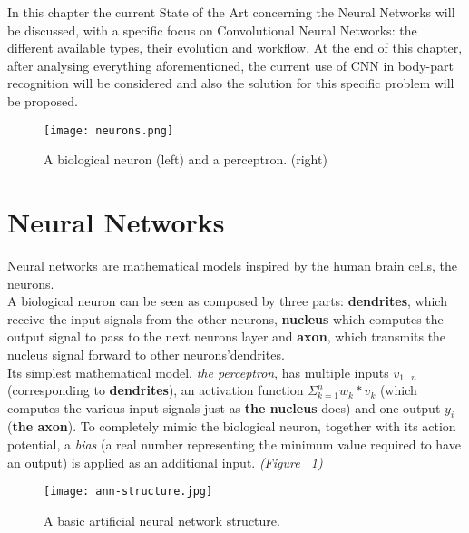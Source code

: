 \documentclass[../main.tex]{subfiles}
\begin{document}
\label{stateofart}
\thispagestyle{empty}

In this chapter the current State of the Art concerning the Neural Networks will be discussed, with a specific focus on Convolutional Neural Networks: the different available types, their evolution and workflow. At the end of this chapter, after analysing everything aforementioned, the current use of CNN in body-part recognition will be considered and also the solution for this specific problem will be proposed. \\ 

\vspace{5mm}
\clearpage
\newpage

\begin{figure}[H]
  \centering
  \texttt{[image: neurons.png]}
  \caption{A biological neuron (left) and a perceptron. (right) \cite{Bio}}
  \label{fig:neuron}
\end{figure}


\section{Neural Networks}
Neural networks are mathematical models inspired by the human brain cells, the neurons. \\ 
A biological neuron can be seen as composed by three parts: \textbf{dendrites}, which receive the input signals from the other neurons, \textbf{nucleus} which computes the output signal to pass to the next neurons layer and \textbf{axon}, which transmits the nucleus signal forward to other neurons'dendrites. \\
Its simplest mathematical model, \textit{the perceptron}, has multiple inputs $v_{1...n}$ (corresponding to \textbf{dendrites}), an activation function $\Sigma_{k=1}^n w_k*v_k$ (which computes the various input signals just as \textbf{the nucleus} does) and one output $y_i$ (\textbf{the axon}). To completely mimic the biological neuron, together with its action potential, a \textit{bias} (a real number representing the minimum value required to have an output) is applied as an additional input. \textit{(Figure ~\ref{fig:neuron})}


\begin{figure}[!b]
  \centering
  \texttt{[image: ann-structure.jpg]}
  \caption{A basic artificial neural network structure. \cite{ANN}}
  \label{fig:ann-structure}
\end{figure}
\end{document}
